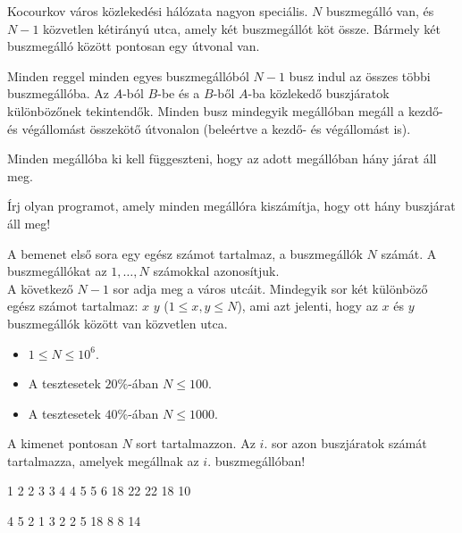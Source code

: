 





Kocourkov város közlekedési hálózata nagyon speciális. $N$ buszmegálló van, és $N-1$ közvetlen kétirányú utca, amely két buszmegállót köt össze. Bármely két buszmegálló között pontosan egy útvonal van.

Minden reggel minden egyes buszmegállóból $N-1$ busz indul az összes többi buszmegállóba. Az $A$-ból $B$-be és a $B$-ből $A$-ba közlekedő buszjáratok különbözőnek tekintendők. Minden busz mindegyik megállóban megáll a kezdő- és végállomást összekötő útvonalon (beleértve a kezdő- és végállomást is).

Minden megállóba ki kell függeszteni, hogy az adott megállóban hány járat áll meg.


Írj olyan programot, amely minden megállóra kiszámítja, hogy ott hány buszjárat áll meg!


A bemenet első sora egy egész számot tartalmaz, a buszmegállók $N$ számát. A buszmegállókat az $1,\ldots,N$ számokkal azonosítjuk.\\
A következő $N-1$ sor adja meg a város utcáit. Mindegyik sor két különböző egész számot tartalmaz: $x \,\, y$  ($1 \le x, y \le N$), ami azt jelenti, hogy az $x$ és $y$ buszmegállók között van közvetlen utca.


\begin{itemize}
  \item $1 \leq N \leq 10^6$.
  \item A tesztesetek $20\%$-ában  $N \leq 100$.
  \item A tesztesetek $40\%$-ában $N \leq 1000$.
\end{itemize}

A kimenet pontosan $N$ sort tartalmazzon. Az $i$. sor azon buszjáratok számát tartalmazza, amelyek megállnak az $i$. buszmegállóban!


1 2
2 3
3 4
4 5
5 6
18
22
22
18
10
\sampleEND

\bigskip

4 5
2 1
3 2
2 5
18
8
8
14
\sampleEND


